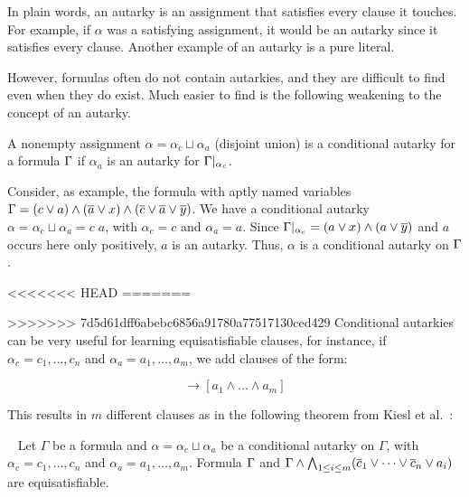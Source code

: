 In plain words, an autarky is an assignment that satisfies every clause it touches. For example, if $\alpha$ was a satisfying assignment, it would be an autarky since it satisfies every clause. Another example of an autarky is a pure literal.

However, formulas often do not contain autarkies, and they are difficult to find even when they do exist. Much easier to find is the following weakening to the concept of an autarky. 

\begin{definition}
    A nonempty assignment $\alpha = \alpha_c \sqcup \alpha_a$ (disjoint union) is a conditional autarky for a formula $\Gamma$ if $\alpha_a$ is an autarky for $\Gamma|_{\alpha_c}$.
\end{definition}

Consider, as example, the formula with aptly named variables $\Gamma = (c \lor a) \land (\overline{a} \lor x) \land (\overline{c} \lor \overline{a} \lor \overline{y})$. We have a conditional autarky $\alpha = \alpha_c \sqcup \alpha_a = c\;a$, with $\alpha_c = c$ and $\alpha_a = a$. Since $\Gamma|_{\alpha_c} = (a \lor x) \land (a \lor \overline{y})$ and $a$ occurs here only positively, $a$ is an autarky. Thus, $\alpha$ is a conditional autarky on $\Gamma$.

<<<<<<< HEAD
=======

>>>>>>> 7d5d61dff6abebc6856a91780a77517130ced429
Conditional autarkies can be very useful for learning equisatisfiable clauses, for instance, if $\alpha_c = c_1, \dots, c_n$ and $\alpha_a = a_1, \dots, a_m$, we add clauses of the form:

\begin{equation*}
    [c_1 \land \dots \land c_n] \rightarrow [a_1 \land \dots \land a_m]
\end{equation*}

This results in $m$ different clauses as in the following theorem from Kiesl et al.~\cite{conditionalautarkies}:

\begin{theorem}~\label{thm:gbcequisat}
    Let $\Gamma$ be a formula and $\alpha = \alpha_c \sqcup \alpha_a$ be a conditional autarky on $\Gamma$, with $\alpha_c = c_1, \dots, c_n$ and $\alpha_a = a_1, \dots, a_m$. Formula $\Gamma$ and $\Gamma \land \bigwedge_{1 \leq i \leq m} (\overline{c}_1 \lor \dots \lor \overline{c}_n \lor a_i)$ are equisatisfiable.
\end{theorem}

